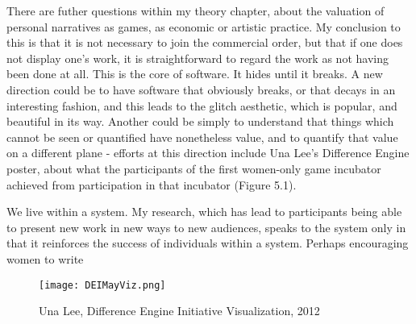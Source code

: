 There are futher questions within my theory chapter, about the valuation of personal narratives as games, as economic or artistic practice. My conclusion to this is that it is not necessary to join the commercial order, but that if one does not display one's work, it is straightforward to regard the work as not having been done at all. This is the core of software. It hides until it breaks. A new direction could be to have software that obviously breaks, or that decays in an interesting fashion, and this leads to the glitch aesthetic, which is popular, and beautiful in its way. Another could be simply to understand that things which cannot be seen or quantified have nonetheless value, and to quantify that value on a different plane - efforts at this direction include Una Lee's Difference Engine poster, about what the participants of the first women-only game incubator achieved from participation in that incubator (Figure 5.1).

We live within a system. My research, which has lead to participants being able to present new work in new ways to new audiences, speaks to the system only in that it reinforces the success of individuals within a system. Perhaps encouraging women to write 

\clearpage
\begin{figure}[!ht]
\centering
  \texttt{[image: DEIMayViz.png]}
 \caption{Una Lee, Difference Engine Initiative Visualization, 2012}
\end{figure}
\clearpage